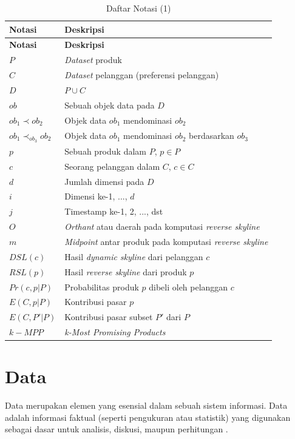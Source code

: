 \begin{longtable}{| p{3cm} | p{7cm} |} 
	\caption{Daftar Notasi (1) \label{tab:daftar-notasi-1}}\\
	\hline
	\multicolumn{1}{|p{3cm}|}{\textbf{Notasi}} & \multicolumn{1}{|p{7cm}|}{\textbf{Deskripsi}}\\ \hline
	\hline
	\endfirsthead
	\hline
	\multicolumn{1}{|p{3cm}|}{\textbf{Notasi}} & \multicolumn{1}{|p{7cm}|}{\textbf{Deskripsi}}\\ \hline 
	\endhead
	$P$ & \textit{Dataset} produk\\ \hline
	$C$ & \textit{Dataset} pelanggan (preferensi pelanggan)\\ \hline
	$D$ & $P \cup C$ \\ \hline
	$ob$ & Sebuah objek data pada $D$\\ \hline
	$ob_1 \prec ob_2$ & Objek data $ob_1$ mendominasi $ob_2$\\ \hline
	$ob_1 \prec_{ob_3} ob_2$ & Objek data $ob_1$ mendominasi $ob_2$ berdasarkan $ob_3$\\ \hline
	$p$ & Sebuah produk dalam $P$, $p \in P$\\ \hline
	$c$ & Seorang pelanggan dalam $C$, $c \in C$\\ \hline
	$d$ & Jumlah dimensi pada $D$\\ \hline
	$i$ & Dimensi ke-1, ..., $d$\\ \hline
	$j$ & Timestamp ke-1, 2, ..., dst\\ \hline
	$O$ & \textit{Orthant} atau daerah pada komputasi \textit{reverse skyline}\\ \hline
	$m$ & \textit{Midpoint} antar produk pada komputasi \textit{reverse skyline}\\ \hline
	$DSL(c)$ & Hasil \textit{dynamic skyline} dari pelanggan $c$\\ \hline
	$RSL(p)$ & Hasil \textit{reverse skyline} dari produk $p$\\ \hline
	$Pr(c, p|P)$ & Probabilitas produk $p$ dibeli oleh pelanggan $c$ \\ \hline
	$E(C, p|P)$ & Kontribusi pasar $p$\\ \hline
	$E(C, P'|P)$ & Kontribusi pasar subset $P'$ dari $P$ \\ \hline
	$k-MPP$ & \textit{k-Most Promising Products} \\ \hline
\end{longtable}

\section{Data}
\tab Data merupakan elemen yang esensial dalam sebuah sistem informasi. Data adalah informasi faktual (seperti pengukuran atau statistik) yang digunakan sebagai dasar untuk analisis, diskusi, maupun perhitungan \cite{data}. 

